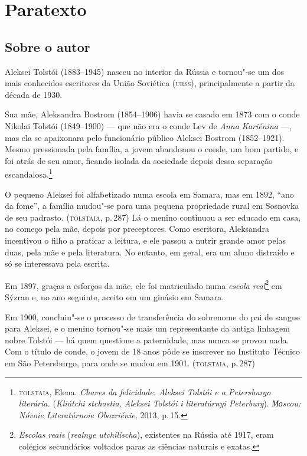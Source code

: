 \chapter{Paratexto}\label{paratexto}


\section{Sobre o autor}\label{para1}

\noindent{}Aleksei Tolstói (1883--1945) nasceu no interior da Rússia e tornou"-se um
dos mais conhecidos escritores da União Soviética (\textsc{urss}), principalmente
a partir da década de 1930.

Sua mãe, Aleksandra Bostrom (1854--1906) havia se casado em 1873 com o
conde Nikolai Tolstói (1849--1900) --- que não era o conde Lev de
\emph{Anna Kariénina} ---, mas ela se apaixonara pelo funcionário
público Aleksei Bostrom (1852--1921). Mesmo pressionada pela família, a
jovem abandonou o conde, um bom partido, e foi atrás de seu amor,
ficando isolada da sociedade depois dessa separação
escandalosa.\footnote{\textsc{tolstaia}, Elena. \emph{Chaves da felicidade.
  Aleksei Tolstói e a Petersburgo literária.} (\emph{Kliútchi stchastia,
  Aleksei Tolstói i literatúrnyi Peterburg}). \emph{Моscou: Nóvoie
  Literatúrnoie Obozriénie,} 2013, p.\,15.}

O pequeno Aleksei foi alfabetizado numa escola em Samara, mas em 1892,
``ano da fome'', a família mudou"-se para uma pequena propriedade rural
em Sosnovka de seu padrasto. (\textsc{tolstaia}, p.\,287) Lá o menino continuou a
ser educado em casa, no começo pela mãe, depois por preceptores. Como
escritora, Aleksandra incentivou o filho a praticar a leitura, e ele
passou a nutrir grande amor pelas duas, pela mãe e pela literatura. No
entanto, em geral, era um aluno distraído e só se interessava pela
escrita.

Em 1897, graças a esforços da mãe, ele foi matriculado numa \emph{escola
real}\footnote{\emph{Escolas reais} (\emph{realnye utchílischa}),
  existentes na Rússia até 1917, eram colégios secundários voltados
  paras as ciências naturais e exatas.} em Sýzran e, no ano seguinte,
aceito em um ginásio em Samara.

Em 1900, concluiu"-se o processo de transferência do sobrenome do pai de
sangue para Aleksei, e o menino tornou"-se mais um representante da
antiga linhagem nobre Tolstói --- há quem questione a paternidade, mas
nunca se provou nada. Com o título de conde, o jovem de 18 anos pôde se
inscrever no Instituto Técnico em São Petersburgo, para onde se mudou em
1901. (\textsc{tolstaia}, p.\,287)

